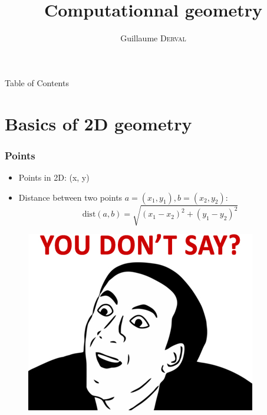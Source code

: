 \documentclass[pdf]{beamer}
\title{Computationnal geometry}
\author{Guillaume \textsc{Derval}}
\begin{document}
\begin{frame}
\titlepage
\end{frame}

{
\begin{frame}{Table of Contents}
\tableofcontents[]
\end{frame}
}



\section{Basics of 2D geometry}
\begin{frame}
	\frametitle{Points}
	\begin{itemize}
		\item Points in 2D: (x, y)
		\item Distance between two points $a=(x_1,y_1), b=(x_2,y_2)$:
		$$\text{dist}(a,b) = \sqrt{(x_1-x_2)^2+(y_1-y_2)^2}$$
	\end{itemize}
	
	\pause
	\begin{figure}
	\centering
	\includegraphics[width=0.7\linewidth]{dontsay}
	\end{figure}
\end{frame}
\end{document}
